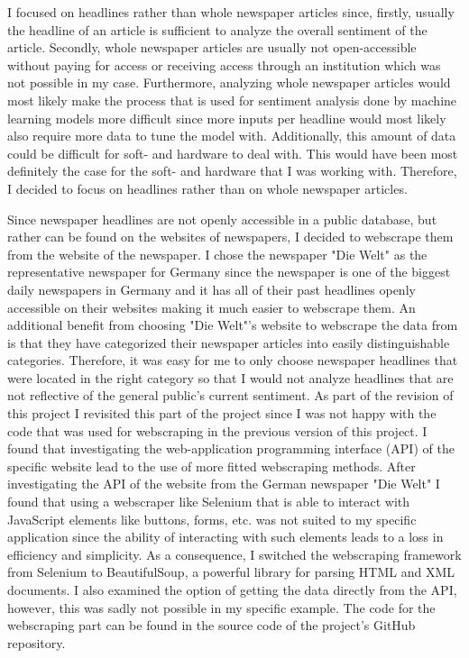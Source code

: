 \documentclass[11pt, a4paper, leqno]{article}
\begin{document}
I focused on headlines rather than whole newspaper articles since, firstly, usually the headline of an article is sufficient to analyze the overall sentiment of the article. Secondly, whole newspaper articles are usually not open-accessible without paying for access or receiving access through an institution which was not possible in my case. Furthermore, analyzing whole newspaper articles would most likely make the process that is used for sentiment analysis done by machine learning models more difficult since more inputs per headline would most likely also require more data to tune the model with. Additionally, this amount of data could be difficult for soft- and hardware to deal with. This would have been most definitely the case for the soft- and hardware that I was working with. Therefore, I decided to focus on headlines rather than on whole newspaper articles.

Since newspaper headlines are not openly accessible in a public database, but rather can be found on the websites of newspapers, I decided to webscrape them from the website of the newspaper. I chose the newspaper "Die Welt" as the representative newspaper for Germany since the newspaper is one of the biggest daily newspapers in Germany and it has all of their past headlines openly accessible on their websites making it much easier to webscrape them. An additional benefit from choosing "Die Welt"'s website to webscrape the data from is that they have categorized their newspaper articles into easily distinguishable categories. Therefore, it was easy for me to only choose newspaper headlines that were located in the right category so that I would not analyze headlines that are not reflective of the general public's current sentiment. As part of the revision of this project I revisited this part of the project since I was not happy with the code that was used for webscraping in the previous version of this project. I found that investigating the web-application programming interface (API) of the specific website lead to the use of more fitted webscraping methods. After investigating the API of the website from the German newspaper "Die Welt" I found that using a webscraper like Selenium that is able to interact with JavaScript elements like buttons, forms, etc. was not suited to my specific application since the ability of interacting with such elements leads to a loss in efficiency and simplicity. As a consequence, I switched the webscraping framework from Selenium to BeautifulSoup, a powerful library for parsing HTML and XML documents. I also examined the option of getting the data directly from the API, however, this was sadly not possible in my specific example. The code for the webscraping part can be found in the source code of the project's GitHub repository.
\end{document}
